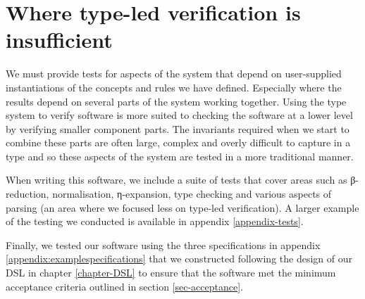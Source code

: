\section{Where type-led verification is insufficient}

We must provide tests for aspects of the system that depend on
user-supplied instantiations of the concepts and rules we have
defined. Especially where the results depend on several parts of the
system working together. Using the type system to verify software is
more suited to checking the software at a lower level by verifying
smaller component parts. The invariants required when we start to
combine these parts are often large, complex and overly difficult to
capture in a type and so these aspects of the system are tested in a
more traditional manner.

When writing this software, we include a suite of tests that cover
areas such as β-reduction, normalisation, η-expansion, type
checking and various aspects of parsing (an area where we
focused less on type-led verification). A larger example of the testing
we conducted is available in appendix \ref{appendix-tests}.

Finally, we tested our software using the three specifications in
appendix \ref{appendix:examplespecifications} that we constructed
following the design of our DSL in chapter \ref{chapter-DSL} to ensure
that the software met the minimum acceptance criteria outlined in
section \ref{sec-acceptance}.
